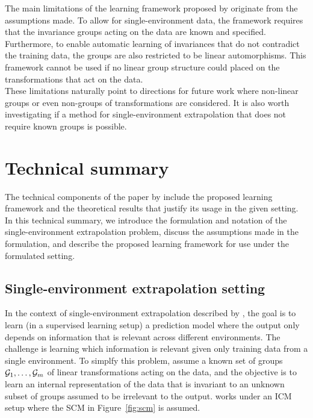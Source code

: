 The main limitations of the learning framework proposed by \textcite{Mouli:2021} originate from the assumptions made. To allow for single-environment data, the framework requires that the invariance groups acting on the data are known and specified. Furthermore, to enable automatic learning of invariances that do not contradict the training data, the groups are also restricted to be linear automorphisms. This framework cannot be used if no linear group structure could placed on the transformations that act on the data.
\\

These limitations naturally point to directions for future work where non-linear groups or even non-groups of transformations are considered. It is also worth investigating if a method for single-environment extrapolation that does not require known groups is possible.


\newpage


\section{Technical summary}

The technical components of the paper by \textcite{Mouli:2021} include the proposed learning framework and the theoretical results that justify its usage in the given setting. In this technical summary, we introduce the formulation and notation of the single-environment extrapolation problem, discuss the assumptions made in the formulation, and describe the proposed learning framework for use under the formulated setting.


\subsection{Single-environment extrapolation setting}

In the context of single-environment extrapolation described by \textcite{Mouli:2021}, the goal is to learn (in a supervised learning setup) a prediction model where the output  only depends on information that is relevant across different environments. The challenge is learning which information is relevant given only training data from a single environment. To simplfy this problem, \citeauthor{Mouli:2021} assume a known set of groups $\mathcal{G}_1,\ldots,\mathcal{G}_m$ of linear transformations acting on the data, and the objective is to learn an internal representation of the data that is invariant to an unknown subset of groups assumed to be irrelevant to the output. \citeauthor{Mouli:2021} works under an ICM setup where the SCM in Figure~\ref{fig:scm} is assumed.

